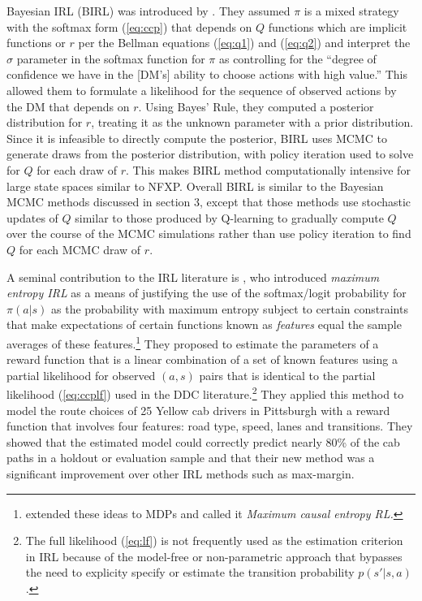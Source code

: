 Bayesian IRL (BIRL) was introduced by \citet{birl:2007}. They assumed $\pi$ is a mixed strategy with the softmax
form (\ref{eq:ccp}) that depends on $Q$ functions which are implicit functions or $r$ per the Bellman equations (\ref{eq:q1}) and
(\ref{eq:q2}) and interpret the $\sigma$ parameter in the softmax function for $\pi$ as
 controlling for the ``degree of confidence we have in the [DM's] ability to
choose actions with high value.'' This allowed them to formulate a likelihood for the sequence of observed actions by
the DM that depends on $r$. Using  Bayes' Rule, they computed a posterior distribution for $r$, treating it as the unknown parameter
with a prior distribution. Since it is infeasible to directly compute the
posterior,  BIRL uses MCMC to generate draws from the posterior
distribution, with policy iteration used to solve for $Q$ for each draw of $r$. This makes BIRL method computationally intensive
for large state spaces similar to NFXP. Overall BIRL is similar to the Bayesian MCMC methods discussed in section 3, except that those
methods use stochastic updates of $Q$ similar to those produced by Q-learning to gradually compute $Q$ over the course
of the MCMC simulations rather than use policy iteration to find $Q$ for each MCMC draw of $r$.

A seminal contribution to the IRL literature is
\citet{ziebart:2008}, who introduced {\it maximum entropy IRL\/} as a means of justifying the use of the softmax/logit
probability for  $\pi(a|s)$ as the probability with maximum entropy subject to certain constraints that make
expectations of certain functions known as {\it features\/} equal the sample averages of these features.\footnote{\footnotesize
\citet{ziebart:2010} extended these ideas to MDPs and called it {\it Maximum causal entropy RL.\/}}
They proposed to estimate the parameters of a reward function that is a linear
combination of a set of known features using a partial likelihood for observed $(a,s)$ pairs
that is identical to the partial likelihood (\ref{eq:ccplf}) used in the DDC literature.\footnote{\footnotesize
The full likelihood
(\ref{eq:lf}) is not frequently used as the estimation criterion in IRL
 because of the model-free or non-parametric approach that bypasses
the need to explicity specify or estimate the transition probability $p(s'|s,a)$.} 
They applied this method to model the route choices of 25 Yellow cab drivers in Pittsburgh with a reward
function that involves four features: road type, speed, lanes and transitions. They showed that the estimated
model could correctly predict nearly 80\% of the cab paths in a holdout or evaluation sample and that
their new method was a significant improvement over other IRL methods such as max-margin.


